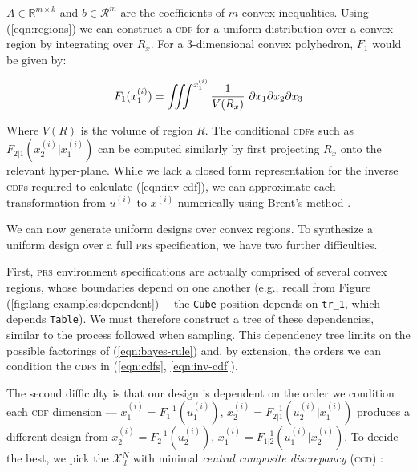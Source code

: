 \documentclass[sigplan, screen]{acmart} %
\newcommand{\expD}{\mathcal{X}^{N}_d}
\begin{document}
$A \in \mathbb{R}^{m \times k}$ and $b \in \mathcal{R}^m$ are the coefficients of $m$ convex inequalities. Using (\ref{eqn:regions}) we can construct a \textsc{cdf} for a uniform distribution over a convex region by integrating over $R_x$. For a 3-dimensional convex polyhedron, $F_1$ would be given by: %

\begin{equation}
    F_1(x^{(i)}_1) = \iiint^{x^{(i)}_1} \frac{1}{V(R_x)}\ \partial x_1 \partial x_2 \partial x_3  \\
\label{eqn:region-cdfs}
\end{equation}

Where $V(R)$ is the volume of region $R$. The conditional \textsc{cdf}s such as $F_{2|1}(x^{(i)}_2 | x^{(i)}_1)$ can be computed similarly by first projecting $R_x$ onto the relevant hyper-plane. While we lack a closed form representation for the inverse \textsc{cdf}s required to calculate (\ref{eqn:inv-cdf}), we can approximate each transformation from $u^{(i)}$ to $x^{(i)}$ numerically using Brent's method \cite{brent2013algorithms}.

We can now generate uniform designs over convex regions. To synthesize a uniform design over a full \textsc{prs} specification, we have two further difficulties. 

First, \textsc{prs} environment specifications are actually comprised of several convex regions, whose boundaries depend on one another (e.g., recall from Figure (\ref{fig:lang-examples:dependent})--- the \texttt{Cube} position depends on \texttt{tr\_1}, which depends \texttt{Table}). We must therefore construct a tree of these dependencies, similar to the process followed when sampling. This dependency tree limits on the possible factorings of (\ref{eqn:bayes-rule}) and, by extension, the orders we can condition the \textsc{cdfs} in (\ref{eqn:cdfs}, \ref{eqn:inv-cdf}).

The second difficulty is that our design is dependent on the order we condition each \textsc{cdf} dimension --- $x^{(i)}_1 = F^{-1}_1(u^{(i)}_{1})$, $x^{(i)}_2 = F_{2 | 1}^{-1}(u^{(i)}_{2} | x^{(i)}_1)$ produces a different design from $x^{(i)}_2 = F^{-1}_2(u^{(i)}_{2})$, $x^{(i)}_1 = F_{1 | 2}^{-1}(u^{(i)}_{1} | x^{(i)}_2)$. To decide the best, we pick the $\expD$ with minimal \emph{central composite discrepancy} (\textsc{ccd}) \cite{chuang2010uniform}:
\end{document}
